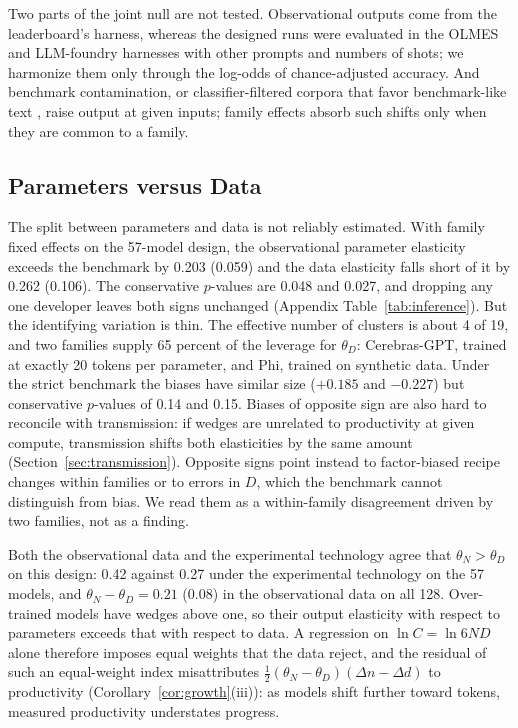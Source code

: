 \documentclass[AER,finalmode]{AEA}
\theoremstyle{definition}
\theoremstyle{remark}
\begin{document}
Two parts of the joint null are not tested. Observational outputs come from the leaderboard's harness, whereas the
designed runs were evaluated in the OLMES and LLM-foundry harnesses with other prompts and numbers of shots; we
harmonize them only through the log-odds of chance-adjusted accuracy. And benchmark contamination, or
classifier-filtered corpora that favor benchmark-like text \citep{dominguezolmedo2025training}, raise output at given
inputs; family effects absorb such shifts only when they are common to a family.

\subsection{Parameters versus Data}\label{sec:split}

The split between parameters and data is not reliably estimated. With family fixed effects on the 57-model design, the
observational parameter elasticity exceeds the benchmark by 0.203 (0.059) and the data elasticity falls short of it by
0.262 (0.106). The conservative $p$-values are 0.048 and 0.027, and dropping any one developer leaves both signs
unchanged (Appendix Table~\ref{tab:inference}). But the identifying variation is thin. The effective number of clusters
is about 4 of 19, and two families supply 65 percent of the leverage for $\theta_D$: Cerebras-GPT, trained at exactly 20
tokens per parameter, and Phi, trained on synthetic data. Under the strict benchmark the biases have similar size
($+0.185$ and $-0.227$) but conservative $p$-values of 0.14 and 0.15. Biases of opposite sign are also hard to
reconcile with transmission: if wedges are unrelated to productivity at given compute, transmission shifts both
elasticities by the same amount (Section~\ref{sec:transmission}). Opposite signs point instead to factor-biased recipe
changes within families or to errors in $D$, which the benchmark cannot distinguish from bias. We read them as a
within-family disagreement driven by two families, not as a finding.

Both the observational data and the experimental technology agree that $\theta_N>\theta_D$ on this design: 0.42
against 0.27 under the experimental technology on the 57 models, and $\theta_N-\theta_D=0.21$ (0.08) in the
observational data on all 128. Over-trained models have wedges above one, so their output elasticity with respect to
parameters exceeds that with respect to data. A regression on $\ln C=\ln6ND$ alone therefore imposes equal weights
that the data reject, and the residual of such an equal-weight index misattributes
$\tfrac12(\theta_N-\theta_D)(\Delta n-\Delta d)$ to productivity (Corollary~\ref{cor:growth}(iii)): as models shift
further toward tokens, measured productivity understates progress.
\end{document}
